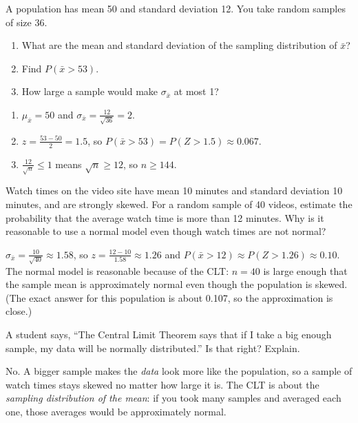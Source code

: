 \begin{Exercise}[title={Center and Spread}, label=clt_basic]
A population has mean 50 and standard deviation 12. You take random samples of size 36.
\begin{enumerate}
\item What are the mean and standard deviation of the sampling distribution of $\bar{x}$?
\item Find $P(\bar{x} > 53)$.
\item How large a sample would make $\sigma_{\bar{x}}$ at most 1?
\end{enumerate}
\end{Exercise}
\begin{Answer}[ref=clt_basic]
\begin{enumerate}
\item $\mu_{\bar{x}} = 50$ and $\sigma_{\bar{x}} = \frac{12}{\sqrt{36}} = 2$.
\item $z = \frac{53 - 50}{2} = 1.5$, so $P(\bar{x} > 53) = P(Z > 1.5) \approx 0.067$.
\item $\frac{12}{\sqrt{n}} \leq 1$ means $\sqrt{n} \geq 12$, so $n \geq 144$.
\end{enumerate}
\end{Answer}

\begin{Exercise}[title={Watch Times}, label=clt_video]
Watch times on the video site have mean 10 minutes and standard deviation 10 minutes, and
are strongly skewed. For a random sample of 40 videos, estimate the probability that the
average watch time is more than 12 minutes. Why is it reasonable to use a normal model
even though watch times are not normal?
\end{Exercise}
\begin{Answer}[ref=clt_video]
$\sigma_{\bar{x}} = \frac{10}{\sqrt{40}} \approx 1.58$, so $z = \frac{12 - 10}{1.58} \approx 1.26$ and
$P(\bar{x} > 12) \approx P(Z > 1.26) \approx 0.10$. The normal model is reasonable because of the
CLT: $n = 40$ is large enough that the sample mean is approximately normal even though the
population is skewed. (The exact answer for this population is about 0.107, so the
approximation is close.)
\end{Answer}

\begin{Exercise}[title={True or False?}, label=clt_misconception]
A student says, ``The Central Limit Theorem says that if I take a big enough sample, my
data will be normally distributed.'' Is that right? Explain.
\end{Exercise}
\begin{Answer}[ref=clt_misconception]
No. A bigger sample makes the \emph{data} look more like the population, so a sample of
watch times stays skewed no matter how large it is. The CLT is about the
\emph{sampling distribution of the mean}: if you took many samples and averaged each one,
those averages would be approximately normal.
\end{Answer}

